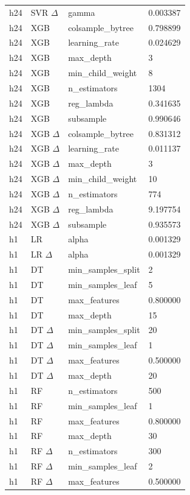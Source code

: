 \begin{longtable}{lp{.20\linewidth}p{.32\linewidth}l}
h24 & SVR $\Delta$ & gamma & \num{0.003387} \\
h24 & XGB & colsample\_bytree & \num{0.798899} \\
h24 & XGB & learning\_rate & \num{0.024629} \\
h24 & XGB & max\_depth & 3 \\
h24 & XGB & min\_child\_weight & 8 \\
h24 & XGB & n\_estimators & 1304 \\
h24 & XGB & reg\_lambda & \num{0.341635} \\
h24 & XGB & subsample & \num{0.990646} \\
h24 & XGB $\Delta$ & colsample\_bytree & \num{0.831312} \\
h24 & XGB $\Delta$ & learning\_rate & \num{0.011137} \\
h24 & XGB $\Delta$ & max\_depth & 3 \\
h24 & XGB $\Delta$ & min\_child\_weight & 10 \\
h24 & XGB $\Delta$ & n\_estimators & 774 \\
h24 & XGB $\Delta$ & reg\_lambda & \num{9.197754} \\
h24 & XGB $\Delta$ & subsample & \num{0.935573} \\
h1 & LR & alpha & \num{0.001329} \\
h1 & LR $\Delta$ & alpha & \num{0.001329} \\
h1 & DT & min\_samples\_split & 2 \\
h1 & DT & min\_samples\_leaf & 5 \\
h1 & DT & max\_features & \num{0.800000} \\
h1 & DT & max\_depth & 15 \\
h1 & DT $\Delta$ & min\_samples\_split & 20 \\
h1 & DT $\Delta$ & min\_samples\_leaf & 1 \\
h1 & DT $\Delta$ & max\_features & \num{0.500000} \\
h1 & DT $\Delta$ & max\_depth & 20 \\
h1 & RF & n\_estimators & 500 \\
h1 & RF & min\_samples\_leaf & 1 \\
h1 & RF & max\_features & \num{0.800000} \\
h1 & RF & max\_depth & 30 \\
h1 & RF $\Delta$ & n\_estimators & 300 \\
h1 & RF $\Delta$ & min\_samples\_leaf & 2 \\
h1 & RF $\Delta$ & max\_features & \num{0.500000} \\

\end{longtable}
